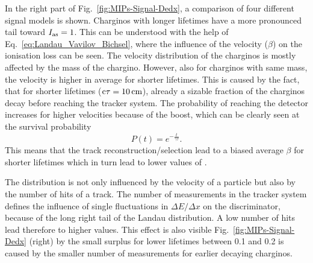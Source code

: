 In the right part of Fig.~\ref{fig:MIPs-Signal-Dedx}, a comparison of four different signal models is shown.
Charginos with longer lifetimes have a more pronounced tail toward $I_{\text{as}}=1$.
This can be understood with the help of Eq.~\eqref{eq:Landau_Vavilov_Bichsel}, where the influence of the velocity ($\beta$) on the ionisation loss can be seen.
The velocity distribution of the charginos is mostly affected by the mass of the chargino.
However, also for charginos with same mass, the velocity is higher in average for shorter lifetimes.
This is caused by the fact, that for shorter lifetimes (\eg $\text{c}\tau=10\,\text{cm}$), already a sizable fraction of the charginos decay before reaching the tracker system.
The probability of reaching the detector increases for higher velocities because of the boost, which can be clearly seen at the survival probability
\begin{equation}
P \left( t \right) = e^{-\frac{t}{\gamma \tau}}.
\end{equation} 
This means that the track reconstruction/selection lead to a biased average $\beta$ for shorter lifetimes which in turn lead to lower values of \ias.

The \ias distribution is not only influenced by the velocity of a particle but also by the number of hits of a track.
The number of measurements in the tracker system defines the influence of single fluctuations in $\Delta E/\Delta x$ on the \ias discriminator, because of the long right tail of the Landau distribution.
A low number of hits lead therefore to higher \ias values.
This effect is also visible Fig.~\ref{fig:MIPs-Signal-Dedx} (right) by the small surplus for lower lifetimes between 0.1 and 0.2 is caused by the smaller number of measurements for earlier decaying charginos.



